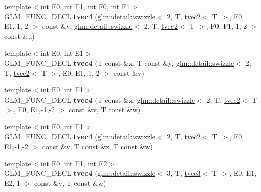 \begin{DoxyCompactItemize}
\item 
\hypertarget{structglm_1_1detail_1_1tvec4_adee18e0982dfe0d8fdf78ff81c25aae6}{{\footnotesize template$<$int \-E0, int \-E1, int \-F0, int \-F1$>$ }\\\-G\-L\-M\-\_\-\-F\-U\-N\-C\-\_\-\-D\-E\-C\-L {\bfseries tvec4} (\hyperlink{structglm_1_1detail_1_1swizzle}{glm\-::detail\-::swizzle}$<$ 2, \-T, \hyperlink{structglm_1_1detail_1_1tvec2}{tvec2}$<$ \-T $>$, \-E0, \-E1,-\/1,-\/2 $>$ const \&v, \hyperlink{structglm_1_1detail_1_1swizzle}{glm\-::detail\-::swizzle}$<$ 2, \-T, \hyperlink{structglm_1_1detail_1_1tvec2}{tvec2}$<$ \-T $>$, \-F0, \-F1,-\/1,-\/2 $>$ const \&u)}\label{structglm_1_1detail_1_1tvec4_adee18e0982dfe0d8fdf78ff81c25aae6}

\item 
\hypertarget{structglm_1_1detail_1_1tvec4_ae9a645660f570ca0e832fe401a611245}{{\footnotesize template$<$int \-E0, int \-E1$>$ }\\\-G\-L\-M\-\_\-\-F\-U\-N\-C\-\_\-\-D\-E\-C\-L {\bfseries tvec4} (\-T const \&x, \-T const \&y, \hyperlink{structglm_1_1detail_1_1swizzle}{glm\-::detail\-::swizzle}$<$ 2, \-T, \hyperlink{structglm_1_1detail_1_1tvec2}{tvec2}$<$ \-T $>$, \-E0, \-E1,-\/1,-\/2 $>$ const \&v)}\label{structglm_1_1detail_1_1tvec4_ae9a645660f570ca0e832fe401a611245}

\item 
\hypertarget{structglm_1_1detail_1_1tvec4_a94bb584377ca8a46ae35f855aed45483}{{\footnotesize template$<$int \-E0, int \-E1$>$ }\\\-G\-L\-M\-\_\-\-F\-U\-N\-C\-\_\-\-D\-E\-C\-L {\bfseries tvec4} (\-T const \&x, \hyperlink{structglm_1_1detail_1_1swizzle}{glm\-::detail\-::swizzle}$<$ 2, \-T, \hyperlink{structglm_1_1detail_1_1tvec2}{tvec2}$<$ \-T $>$, \-E0, \-E1,-\/1,-\/2 $>$ const \&v, \-T const \&w)}\label{structglm_1_1detail_1_1tvec4_a94bb584377ca8a46ae35f855aed45483}

\item 
\hypertarget{structglm_1_1detail_1_1tvec4_abd003ec43fbcc292214a4ce11fe93993}{{\footnotesize template$<$int \-E0, int \-E1$>$ }\\\-G\-L\-M\-\_\-\-F\-U\-N\-C\-\_\-\-D\-E\-C\-L {\bfseries tvec4} (\hyperlink{structglm_1_1detail_1_1swizzle}{glm\-::detail\-::swizzle}$<$ 2, \-T, \hyperlink{structglm_1_1detail_1_1tvec2}{tvec2}$<$ \-T $>$, \-E0, \-E1,-\/1,-\/2 $>$ const \&v, \-T const \&z, \-T const \&w)}\label{structglm_1_1detail_1_1tvec4_abd003ec43fbcc292214a4ce11fe93993}

\item 
\hypertarget{structglm_1_1detail_1_1tvec4_a4e9e3c73a1c3f3e7a545a0ed68819114}{{\footnotesize template$<$int \-E0, int \-E1, int \-E2$>$ }\\\-G\-L\-M\-\_\-\-F\-U\-N\-C\-\_\-\-D\-E\-C\-L {\bfseries tvec4} (\hyperlink{structglm_1_1detail_1_1swizzle}{glm\-::detail\-::swizzle}$<$ 3, \-T, \hyperlink{structglm_1_1detail_1_1tvec3}{tvec3}$<$ \-T $>$, \-E0, \-E1, \-E2,-\/1 $>$ const \&v, \-T const \&w)}\label{structglm_1_1detail_1_1tvec4_a4e9e3c73a1c3f3e7a545a0ed68819114}


\end{DoxyCompactItemize}
